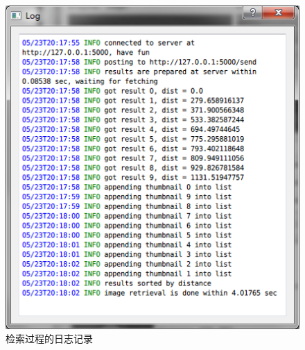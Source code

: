 \begin{figure}[H]
  \centering
  \includegraphics[keepaspectratio=true]{images/ui-retrieve-log.png}
  \caption{检索过程的日志记录}
  \label{fig:ui-retrieve-log}
\end{figure}

